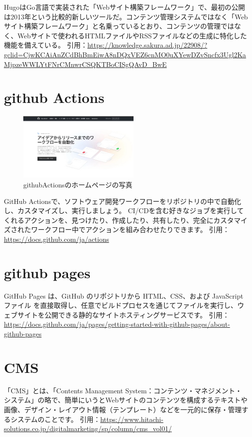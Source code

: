   \begin{tcolorbox}[title=hugoとは]
    HugoはGo言語で実装された「Webサイト構築フレームワーク」で、最初の公開は2013年という比較的新しいツールだ。コンテンツ管理システムではなく「Webサイト構築フレームワーク」と名乗っているとおり、コンテンツの管理ではなく、Webサイトで使われるHTMLファイルやRSSファイルなどの生成に特化した機能を備えている。
    引用：\url{https://knowledge.sakura.ad.jp/22908/?gclid=CjwKCAiAnZCdBhBmEiwA8nDQxVEZ6cnMO0uXYewDZvSncfx3Ugl2KaMjpzeWWLYtFNrCMnwrCSQKTBoCISgQAvD_BwE}
  \end{tcolorbox}

\section{github Actions}

  \begin{figure}[H]
    \centering
    \includegraphics[width=6cm]{./image/02-chap3/githubActions.png}
    \caption{githubActionsのホームページの写真}
    \label{chap3-githubAction-image}
  \end{figure}

  \begin{tcolorbox}[title=github pagesとは]
    GitHub Actionsで、ソフトウェア開発ワークフローをリポジトリの中で自動化し、カスタマイズし、実行しましょう。 CI/CDを含む好きなジョブを実行してくれるアクションを、見つけたり、作成したり、共有したり、完全にカスタマイズされたワークフロー中でアクションを組み合わせたりできます。
    引用：\url{https://docs.github.com/ja/actions}
  \end{tcolorbox}

\section{github pages}

  \begin{tcolorbox}[title=hugoとは]
    GitHub Pages は、GitHub のリポジトリから HTML、CSS、および JavaScript ファイル を直接取得し、任意でビルドプロセスを通じてファイルを実行し、ウェブサイトを公開できる静的なサイトホスティングサービスです。
    引用：\url{https://docs.github.com/ja/pages/getting-started-with-github-pages/about-github-pages}
  \end{tcolorbox}


\section{CMS}

  \begin{tcolorbox}[title=hugoとは]
    「CMS」とは、「Contents Management System：コンテンツ・マネジメント・システム」の略で、簡単にいうとWebサイトのコンテンツを構成するテキストや画像、デザイン・レイアウト情報（テンプレート）などを一元的に保存・管理するシステムのことです。
    引用：\url{https://www.hitachi-solutions.co.jp/digitalmarketing/sp/column/cms_vol01/} 
  \end{tcolorbox}

